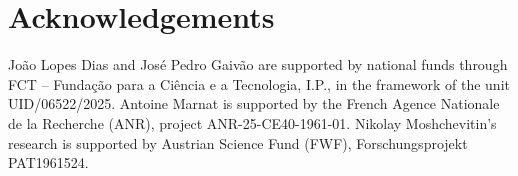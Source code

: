 \documentclass[12pt,reqno,a4paper]{amsart}%
\numberwithin{equation}{section}
\begin{document}
\section*{Acknowledgements}

João Lopes Dias and José Pedro Gaivão are supported by national funds through FCT – Fundação para a Ciência e a Tecnologia, I.P., in the framework of the unit UID/06522/2025.  Antoine Marnat is supported by the French Agence Nationale de la Recherche (ANR), project ANR-25-CE40-1961-01.  Nikolay Moshchevitin's research is supported by Austrian Science Fund (FWF), Forschungsprojekt PAT1961524.

 
 
	
\end{document}
